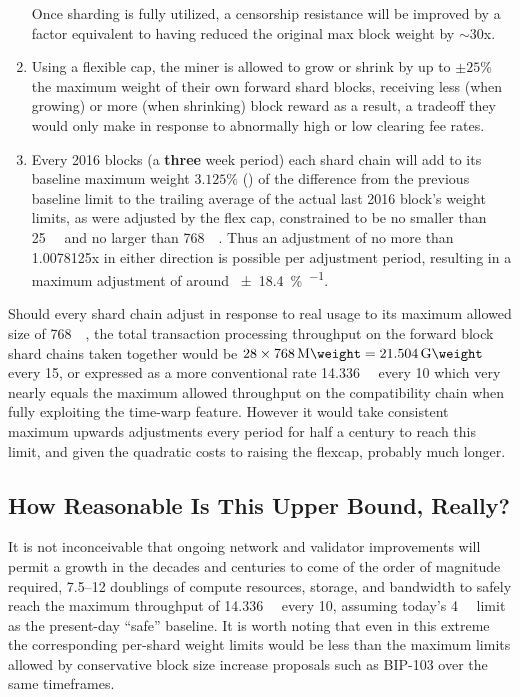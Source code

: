 \begin{enumerate}
Once sharding is fully utilized, a censorship resistance will be
improved by a factor equivalent to having reduced the original max
block weight by $\sim 30$x.


  \item

    Using a flexible cap, the miner is allowed to grow or shrink by up
    to $\pm 25\%$ the maximum weight of their own forward shard
    blocks, receiving less (when growing) or more (when shrinking)
    block reward as a result, a tradeoff they would only make in
    response to abnormally high or low clearing fee rates.

  \item

    Every \num{2016} blocks (a \textbf{three} week period) each shard
    chain will add to its baseline maximum weight $3.125\%$
    () of the difference from the previous baseline limit
    to the trailing average of the actual last \num{2016} block's
    weight limits, as were adjusted by the flex cap, constrained to be
    no smaller than \SI{25}{\kilo\weight} and no larger than
    \SI{768}{\mega\weight}.  Thus an adjustment of no more than
    \num{1.0078125}x in either direction is possible per adjustment
    period, resulting in a maximum adjustment of around
    \SI[per-mode=symbol]{\pm 18.4}{\percent\per\year}.

\end{enumerate}

Should every shard chain adjust in response to real usage to its
maximum allowed size of \SI{768}{\mega\weight}, the total transaction
processing throughput on the forward block shard chains taken together
would be $28 \times \SI{768}{\mega\weight}=\SI{21.504}{\giga\weight}$
every \SI{15}{\min}, or expressed as a more conventional rate
\SI{14.336}{\giga\weight} every \SI{10}{\min} which very nearly equals
the maximum allowed throughput on the compatibility chain when fully
exploiting the time-warp feature.  However it would take consistent
maximum upwards adjustments every period for half a century to reach
this limit, and given the quadratic costs to raising the flexcap,
probably much longer.

\subsection{How Reasonable Is This Upper Bound, Really?}

It is not inconceivable that ongoing network and validator
improvements will permit a growth in the decades and centuries to come
of the order of magnitude required, \numrange{7.5}{12} doublings of
compute resources, storage, and bandwidth to safely reach the maximum
throughput of \SI{14.336}{\giga\weight} every \SI{10}{\min}, assuming
today's \SI{4}{\mega\weight} limit as the present-day ``safe''
baseline.  It is worth noting that even in this extreme the
corresponding per-shard weight limits would be less than the maximum
limits allowed by conservative block size increase proposals such as
BIP-103 over the same timeframes.

